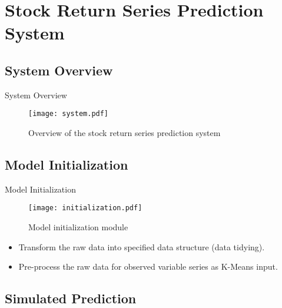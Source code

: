 
\section{\large Stock Return Series Prediction System}


\subsection{System Overview}

\begin{frame}[fragile,t]{System Overview}
	\begin{figure}[!hbt]
    \center
    \texttt{[image: system.pdf]}
    \caption{Overview of the stock return series prediction system}
    \label{fig:system:overview}
    \end{figure}
\end{frame}


\subsection{Model Initialization}

\begin{frame}[fragile,t]{Model Initialization}
	\begin{figure}[!hbt]
    \center
    \texttt{[image: initialization.pdf]}
    \caption{Model initialization module}
    \label{fig:system:init}
    \end{figure}

    \begin{itemize}
    \item Transform the raw data into specified data structure (data tidying).
    \item Pre-process the raw data for observed variable series as K-Means input.
    \end{itemize}
\end{frame}


\subsection{Simulated Prediction}

